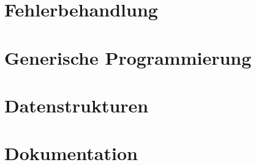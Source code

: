 \section{Fehlerbehandlung}
	

\section{Generische Programmierung}
	

\section{Datenstrukturen}
	

\section{Dokumentation}
	
